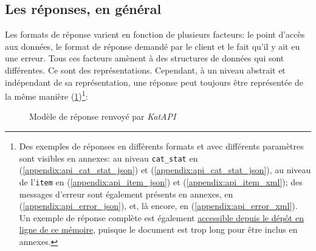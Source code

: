 \subsection{Les réponses, en général}
Les formats de réponse varient en fonction de plusieurs facteurs: le point d'accès aux données, le format de réponse demandé par le client et le fait qu'il y ait eu une erreur. Tous ces facteurs amènent à des structures de données qui sont différentes. Ce sont des représentations. Cependant, à un niveau abstrait et indépendant de sa représentation, une réponse peut toujours être représentée de la même manière (\ref{fig:response})\footnote{
	Des exemples de réponses en différents formats et avec différents paramètres sont visibles en annexes: au niveau \texttt{cat\_stat} en \json{} (\ref{appendix:api_cat_stat_json}) et \tei{} (\ref{appendix:api_cat_stat_json}), au niveau de l'\texttt{item} en \json{} (\ref{appendix:api_item_json}) et \tei{} (\ref{appendix:api_item_xml}); des messages d'erreur sont également présents en annexes, en \json{} (\ref{appendix:api_error_json}), et, là encore, en \tei{} (\ref{appendix:api_error_xml}). Un exemple de réponse complète est également \href{https://github.com/paulhectork/tnah2022_memoire/blob/main/texte_sources/annexes/api_cat_full.xml}{accessible depuis le dépôt en ligne de ce mémoire}, puisque le document est trop long pour être inclus en annexes.
}:

\begin{figure}[h!]
	\caption{Modèle de réponse renvoyé par \textit{KatAPI}}
	\label{fig:response}
\end{figure}

